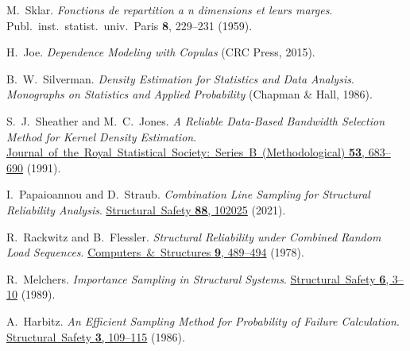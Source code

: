 {\hangindent=0.33in {}\hypertarget{15494272573324799614}{}M.~Sklar. \emph{Fonctions de repartition a n dimensions et leurs marges}. Publ.~inst.~statist.~univ.~Paris \textbf{8}, 229–231 (1959).

\hangindent=0.33in {}\hypertarget{4026133216555554139}{}H.~Joe. \emph{Dependence Modeling with Copulas} (CRC Press, 2015).

\hangindent=0.33in {}\hypertarget{3820492032986589588}{}B.~W.~Silverman. \emph{Density Estimation for Statistics and Data Analysis}. \emph{Monographs on Statistics and Applied Probability} (Chapman \& Hall, 1986).

\hangindent=0.33in {}\hypertarget{15023702097247238757}{}S.~J.~Sheather and M.~C.~Jones. \emph{A Reliable Data-Based Bandwidth Selection Method for Kernel Density Estimation}. \href{https://doi.org/10.1111/j.2517-6161.1991.tb01857.x}{Journal~of~the~Royal~Statistical~Society:~Series~B~(Methodological) \textbf{53}, 683–690} (1991).

\hangindent=0.33in {}\hypertarget{5290438035122008794}{}I.~Papaioannou and D.~Straub. \emph{Combination Line Sampling for Structural Reliability Analysis}. \href{https://doi.org/10.1016/j.strusafe.2020.102025}{Structural~Safety \textbf{88}, 102025} (2021).

\hangindent=0.33in {}\hypertarget{9935717079447158324}{}R.~Rackwitz and B.~Flessler. \emph{Structural Reliability under Combined Random Load Sequences}. \href{https://doi.org/10.1016/0045-7949(78)90046-9}{Computers~\&~Structures \textbf{9}, 489–494} (1978).

\hangindent=0.33in {}\hypertarget{7384485740282643180}{}R.~Melchers. \emph{Importance Sampling in Structural Systems}. \href{https://doi.org/10.1016/0167-4730(89)90003-9}{Structural~Safety \textbf{6}, 3–10} (1989).

\hangindent=0.33in {}\hypertarget{8183389152391755847}{}A.~Harbitz. \emph{An Efficient Sampling Method for Probability of Failure Calculation}. \href{https://doi.org/10.1016/0167-4730(86)90012-3}{Structural~Safety \textbf{3}, 109–115} (1986).

}
